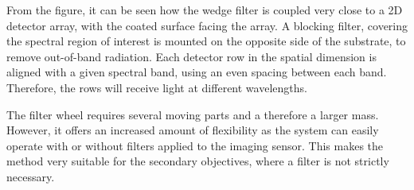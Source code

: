 From the figure, it can be seen how the wedge filter is coupled very close to a 2D detector array, with the coated surface facing the array. A blocking filter, covering the spectral region of interest is mounted on the opposite side of the substrate, to remove out-of-band radiation. Each detector row in the spatial dimension is aligned with a given spectral band, using an even spacing between each band. Therefore, the rows will receive light at different wavelengths.

The filter wheel requires several moving parts and a therefore a larger mass. However, it offers an increased amount of flexibility as the system can easily operate with or without filters applied to the imaging sensor. This makes the method very suitable for the secondary objectives, where a filter is not strictly necessary.

